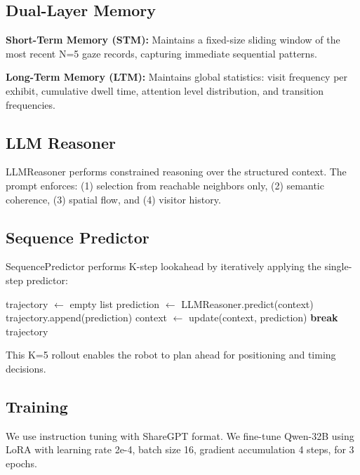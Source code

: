 \documentclass{article}
\begin{document}
\subsection{Dual-Layer Memory}

\textbf{Short-Term Memory (STM):} Maintains a fixed-size sliding window of the most recent N=5 gaze records, capturing immediate sequential patterns.

\textbf{Long-Term Memory (LTM):} Maintains global statistics: visit frequency per exhibit, cumulative dwell time, attention level distribution, and transition frequencies.

\subsection{LLM Reasoner}

LLMReasoner performs constrained reasoning over the structured context. The prompt enforces: (1) selection from reachable neighbors only, (2) semantic coherence, (3) spatial flow, and (4) visitor history.

\subsection{Sequence Predictor}

SequencePredictor performs K-step lookahead by iteratively applying the single-step predictor:

\begin{algorithm}[h]
\caption{K-Step Sequence Prediction}
\begin{algorithmic}[1]
\State trajectory $\gets$ empty list
    \State prediction $\gets$ LLMReasoner.predict(context)
    \State trajectory.append(prediction)
    \State context $\gets$ update(context, prediction)
     \textbf{break} \EndIf
\EndFor
\State \Return trajectory
\end{algorithmic}
\end{algorithm}

This K=5 rollout enables the robot to plan ahead for positioning and timing decisions.

\subsection{Training}

We use instruction tuning with ShareGPT format. We fine-tune Qwen-32B using LoRA with learning rate 2e-4, batch size 16, gradient accumulation 4 steps, for 3 epochs.
\end{document}
